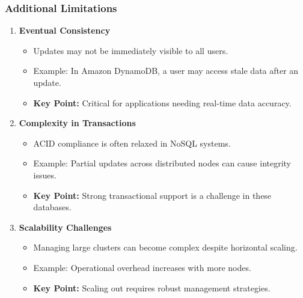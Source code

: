 \documentclass[aspectratio=169]{beamer}
\begin{document}
\begin{frame}[fragile]
    \frametitle{Additional Limitations}
    \begin{enumerate}[resume]
        \item \textbf{Eventual Consistency}
            \begin{itemize}
                \item Updates may not be immediately visible to all users.
                \item Example: In Amazon DynamoDB, a user may access stale data after an update.
                \item \textbf{Key Point:} Critical for applications needing real-time data accuracy.
            \end{itemize}
        \item \textbf{Complexity in Transactions}
            \begin{itemize}
                \item ACID compliance is often relaxed in NoSQL systems.
                \item Example: Partial updates across distributed nodes can cause integrity issues.
                \item \textbf{Key Point:} Strong transactional support is a challenge in these databases.
            \end{itemize}
        \item \textbf{Scalability Challenges}
            \begin{itemize}
                \item Managing large clusters can become complex despite horizontal scaling.
                \item Example: Operational overhead increases with more nodes.
                \item \textbf{Key Point:} Scaling out requires robust management strategies.
            \end{itemize}
    \end{enumerate}
\end{frame}
\end{document}
